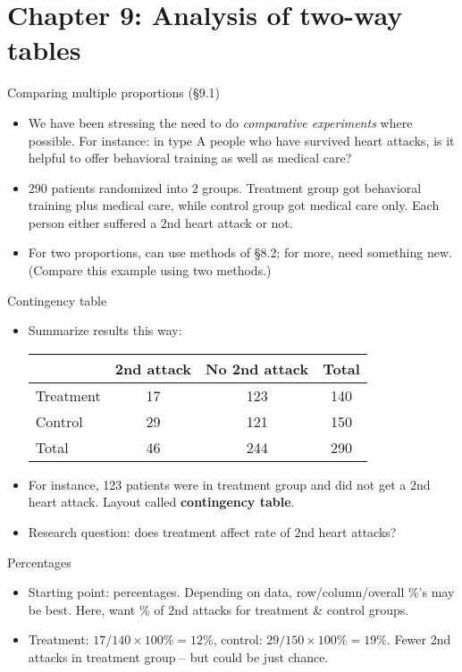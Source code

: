 
\part{Chapter 9: Analysis of two-way tables}

\begin{slide}{Comparing multiple proportions (\S 9.1)}
  \begin{itemize}
  \item 
We have been stressing the need to do {\em comparative experiments}
where possible. For instance: in type A people who have survived heart
attacks, is it helpful to offer behavioral training as well as medical
care?

\item 290 patients randomized into 2 groups. Treatment group got behavioral training
plus medical care, while control group got medical care only. Each person
either suffered a 2nd heart attack or not.

\item For two proportions, can use methods of \S 8.2; for more, need
  something new. (Compare this example using two methods.)

  \end{itemize}
\end{slide}
\begin{slide}{Contingency table}
  \begin{itemize}
  \item 
Summarize results this way:

\begin{tabular}{l|cc|c}
\hline
& 2nd attack & No 2nd attack & Total\\
\hline
Treatment & 17 & 123 & 140\\
Control   & 29 & 121 & 150\\
\hline
Total & 46 & 244 & 290\\
\hline
\end{tabular}

\item For instance, 123 patients were in treatment group and did not get a
2nd heart attack. Layout called {\bf contingency table}.

\item Research question: does treatment affect rate of 2nd heart attacks?

  \end{itemize}
\end{slide}
\begin{slide}{Percentages}
  \begin{itemize}
  \item 
Starting point: percentages. Depending on data, row/column/overall
\%'s may be best. Here, want \% of 2nd attacks for treatment \&
control groups.

\item Treatment: $17/140\times 100\% = 12\%$, control: $29/150\times
100\%=19\%$.  Fewer 2nd attacks in treatment group -- but could be
just chance.

  \end{itemize}
\end{slide}

